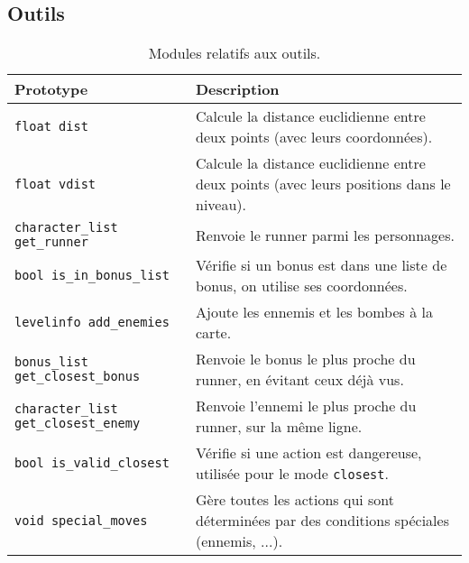 \subsection{Outils}

\begin{table}[!htpb]
    \label{tab:modules-tools}
    \begin{tabularx}{\textwidth}{lX}
        \toprule
        \textbf{Prototype} & \textbf{Description} \\
        \midrule
        \texttt{float dist} & Calcule la distance euclidienne entre deux points (avec leurs coordonnées). \\
        \texttt{float vdist} & Calcule la distance euclidienne entre deux points (avec leurs positions dans le niveau). \\
        \texttt{character\_list get\_runner} & Renvoie le runner parmi les personnages. \\
        \texttt{bool is\_in\_bonus\_list} & Vérifie si un bonus est dans une liste de bonus, on utilise ses coordonnées. \\
        \texttt{levelinfo add\_enemies} & Ajoute les ennemis et les bombes à la carte. \\
        \texttt{bonus\_list get\_closest\_bonus} & Renvoie le bonus le plus proche du runner, en évitant ceux déjà vus. \\
        \texttt{character\_list get\_closest\_enemy} & Renvoie l'ennemi le plus proche du runner, sur la même ligne. \\
        \texttt{bool is\_valid\_closest} & Vérifie si une action est dangereuse, utilisée pour le mode \texttt{closest}. \\
        \texttt{void special\_moves} & Gère toutes les actions qui sont déterminées par des conditions spéciales (ennemis, ...). \\
        \bottomrule
    \end{tabularx}
    \caption{Modules relatifs aux outils.}
\end{table}
